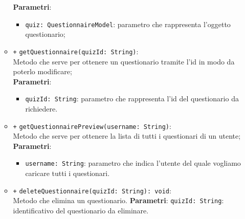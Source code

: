 \begin{itemize}
\begin{itemize}
			\textbf{Parametri}:
			\begin{itemize}
				\item \texttt{quiz: QuestionnaireModel}: parametro che rappresenta l'oggetto questionario;
			\end{itemize}
		\item \texttt{+} \texttt{getQuestionnaire(quizId: String)}: \\Metodo che serve per ottenere un questionario tramite l'id in modo da poterlo modificare; \\
			\textbf{Parametri}:
			\begin{itemize}
				\item \texttt{quizId: String}: parametro che rappresenta l'id del questionario da richiedere.
			\end{itemize}
		\item \texttt{+} \texttt{getQuestionnairePreview(username: String)}: \\ Metodo che serve per ottenere la lista di tutti i questionari di un utente; \\
			\textbf{Parametri}:
			\begin{itemize}
				\item \texttt{username: String}: parametro che indica l'utente del quale vogliamo caricare tutti i questionari.
			\end{itemize}
		\item \texttt{+} \texttt{deleteQuestionnaire(quizId: String): void}: \\Metodo che elimina un questionario.
		\textbf{Parametri}:
		\texttt{quizId: String}: identificativo del questionario da eliminare.
	\end{itemize}
\end{itemize}

